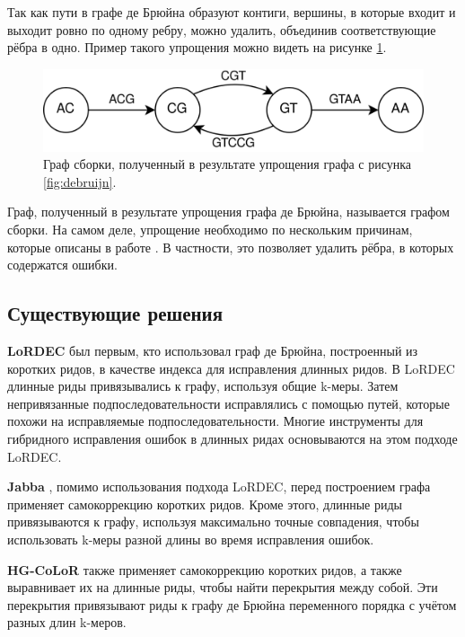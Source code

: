 \documentclass[14pt]{matmex-diploma-custom}
\begin{document}
Так как пути в графе де Брюйна образуют контиги, вершины, в которые входит и выходит ровно по одному ребру, можно удалить, объединив соответствующие рёбра в одно. Пример такого упрощения можно видеть на рисунке \ref{fig:debruijn_simpl}.

\begin{figure}[h]
	\centering
	\includegraphics[scale=0.22]{debruijn_simpl.png}
	\caption{Граф сборки, полученный в результате упрощения графа с рисунка \ref{fig:debruijn}.}
	\label{fig:debruijn_simpl}
\end{figure}

Граф, полученный в результате упрощения графа де Брюйна, называется графом сборки. На самом деле, упрощение необходимо по нескольким причинам, которые описаны в работе \cite{art:disser_andrey}. В частности, это позволяет удалить рёбра, в которых содержатся ошибки.

\subsection{Существующие решения}
\textbf{LoRDEC} \cite{art:salmela2014lordec} был первым, кто использовал граф де Брюйна, построенный из коротких ридов, в качестве индекса для исправления длинных ридов. В LoRDEC длинные риды привязывались к графу, используя общие k-меры. Затем непривязанные подпоследовательности исправлялись с помощью путей, которые похожи на исправляемые подпоследовательности. Многие инструменты для гибридного исправления ошибок в длинных ридах основываются на этом подходе LoRDEC.

\textbf{Jabba} \cite{art:miclotte2016jabba}, помимо использования подхода LoRDEC, перед построением графа применяет самокоррекцию коротких ридов. Кроме этого, длинные риды привязываются к графу, используя максимально точные совпадения, чтобы использовать k-меры разной длины во время исправления ошибок.

\textbf{HG-CoLoR} \cite{art:morisse2018hybrid} также применяет самокоррекцию коротких ридов, а также выравнивает их на длинные риды, чтобы найти перекрытия между собой. Эти перекрытия привязывают риды к графу де Брюйна переменного порядка с учётом разных длин k-меров.
\end{document}
